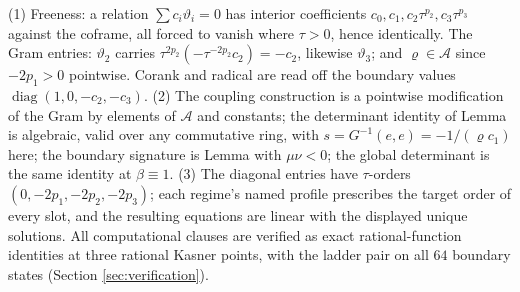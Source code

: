 (1) Freeness: a relation $\sum c_i\vartheta_i = 0$ has interior coefficients $c_0, c_1, c_2\tau^{p_2}, c_3\tau^{p_3}$ against the coframe, all forced to vanish where $\tau > 0$, hence identically. The Gram entries: $\vartheta_2$ carries $\tau^{2p_2}(-\tau^{-2p_2}c_2) = -c_2$, likewise $\vartheta_3$; and $\varrho \in \mathcal{A}$ since $-2p_1 > 0$ pointwise. Corank and radical are read off the boundary values $\operatorname{diag}(1, 0, -c_2, -c_3)$. (2) The coupling construction is a pointwise modification of the Gram by elements of $\mathcal{A}$ and constants; the determinant identity of Lemma  is algebraic, valid over any commutative ring, with $s = G^{-1}(e,e) = -1/(\varrho c_1)$ here; the boundary signature is Lemma  with $\mu\nu < 0$; the global determinant is the same identity at $\beta \equiv 1$. (3) The diagonal entries have $\tau$-orders $(0, -2p_1, -2p_2, -2p_3)$; each regime's named profile prescribes the target order of every slot, and the resulting equations are linear with the displayed unique solutions. All computational clauses are verified as exact rational-function identities at three rational Kasner points, with the ladder pair on all $64$ boundary states (Section \ref{sec:verification}).

